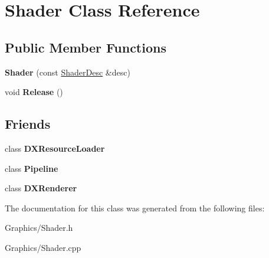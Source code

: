 \hypertarget{classShader}{}\section{Shader Class Reference}
\label{classShader}
\subsection*{Public Member Functions}
\begin{DoxyCompactItemize}
\item 
\mbox{\label{classShader_a4ade2b5d584cbcc81de3aa6d9475a0f8}} 
{\bfseries Shader} (const \hyperlink{structShaderDesc}{Shader\+Desc} \&desc)
\item 
\mbox{\label{classShader_ab54c6fe63a0961380132be979f00a791}} 
void {\bfseries Release} ()
\end{DoxyCompactItemize}
\subsection*{Friends}
\begin{DoxyCompactItemize}
\item 
\mbox{\label{classShader_a871268c492209c5a9db9dc2db99f4d04}} 
class {\bfseries D\+X\+Resource\+Loader}
\item 
\mbox{\label{classShader_af9f0f1adbd5baee7830839447205af8d}} 
class {\bfseries Pipeline}
\item 
\mbox{\label{classShader_a14ab6f966322dccbf6597d0c82bf48c6}} 
class {\bfseries D\+X\+Renderer}
\end{DoxyCompactItemize}


The documentation for this class was generated from the following files\+:\begin{DoxyCompactItemize}
\item 
Graphics/Shader.\+h\item 
Graphics/Shader.\+cpp\end{DoxyCompactItemize}
